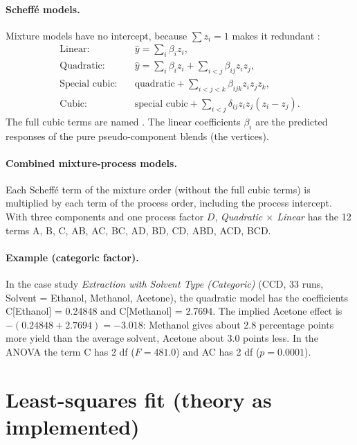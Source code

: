 \paragraph{Scheffé models.} Mixture models have no intercept, because $\sum z_i=1$ makes it redundant
\citep{scheffe1958,cornell2002}:
\begin{align}
  \text{Linear:}\quad &\hat y=\sum_i\beta_i z_i, \label{eq:ch05-scheffe-lin}\\
  \text{Quadratic:}\quad &\hat y=\sum_i\beta_i z_i+\sum_{i<j}\beta_{ij}z_iz_j, \label{eq:ch05-scheffe-quad}\\
  \text{Special cubic:}\quad &\text{quadratic}+\sum_{i<j<k}\beta_{ijk}z_iz_jz_k, \label{eq:ch05-scheffe-sc}\\
  \text{Cubic:}\quad &\text{special cubic}+\sum_{i<j}\delta_{ij}z_iz_j(z_i-z_j). \label{eq:ch05-scheffe-cub}
\end{align}
The full cubic terms are named . The linear coefficients $\beta_i$ are the predicted responses
of the pure pseudo-component blends (the vertices).

\paragraph{Combined mixture-process models.} Each Scheffé term of the mixture order (without the full
cubic terms) is multiplied by each term of the process order, including the process intercept. With three
components and one process factor $D$, \emph{Quadratic $\times$ Linear} has the 12 terms A, B, C, AB, AC,
BC, AD, BD, CD, ABD, ACD, BCD.

\paragraph{Example (categoric factor).} In the case study \emph{Extraction with Solvent Type (Categoric)}
(CCD, 33 runs, Solvent = Ethanol, Methanol, Acetone), the quadratic model has the coefficients
C[Ethanol] = 0.24848 and C[Methanol] = 2.7694. The implied Acetone effect is
$-(0.24848+2.7694)=-3.018$: Methanol gives about 2.8 percentage points more yield than the average solvent,
Acetone about 3.0 points less. In the ANOVA the term C has 2 df ($F=481.0$) and AC has 2 df ($p=0.0001$).

\section{Least-squares fit (theory as implemented)}\label{sec:ch05-ols}

